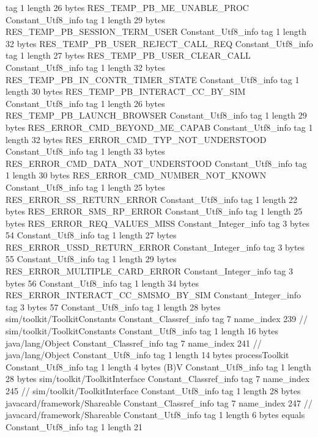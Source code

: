 {{{			tag	1
			length	26
			bytes	RES_TEMP_PB_ME_UNABLE_PROC
		}
		Constant_Utf8_info {
			tag	1
			length	29
			bytes	RES_TEMP_PB_SESSION_TERM_USER
		}
		Constant_Utf8_info {
			tag	1
			length	32
			bytes	RES_TEMP_PB_USER_REJECT_CALL_REQ
		}
		Constant_Utf8_info {
			tag	1
			length	27
			bytes	RES_TEMP_PB_USER_CLEAR_CALL
		}
		Constant_Utf8_info {
			tag	1
			length	32
			bytes	RES_TEMP_PB_IN_CONTR_TIMER_STATE
		}
		Constant_Utf8_info {
			tag	1
			length	30
			bytes	RES_TEMP_PB_INTERACT_CC_BY_SIM
		}
		Constant_Utf8_info {
			tag	1
			length	26
			bytes	RES_TEMP_PB_LAUNCH_BROWSER
		}
		Constant_Utf8_info {
			tag	1
			length	29
			bytes	RES_ERROR_CMD_BEYOND_ME_CAPAB
		}
		Constant_Utf8_info {
			tag	1
			length	32
			bytes	RES_ERROR_CMD_TYP_NOT_UNDERSTOOD
		}
		Constant_Utf8_info {
			tag	1
			length	33
			bytes	RES_ERROR_CMD_DATA_NOT_UNDERSTOOD
		}
		Constant_Utf8_info {
			tag	1
			length	30
			bytes	RES_ERROR_CMD_NUMBER_NOT_KNOWN
		}
		Constant_Utf8_info {
			tag	1
			length	25
			bytes	RES_ERROR_SS_RETURN_ERROR
		}
		Constant_Utf8_info {
			tag	1
			length	22
			bytes	RES_ERROR_SMS_RP_ERROR
		}
		Constant_Utf8_info {
			tag	1
			length	25
			bytes	RES_ERROR_REQ_VALUES_MISS
		}
		Constant_Integer_info {
			tag	3
			bytes	54
		}
		Constant_Utf8_info {
			tag	1
			length	27
			bytes	RES_ERROR_USSD_RETURN_ERROR
		}
		Constant_Integer_info {
			tag	3
			bytes	55
		}
		Constant_Utf8_info {
			tag	1
			length	29
			bytes	RES_ERROR_MULTIPLE_CARD_ERROR
		}
		Constant_Integer_info {
			tag	3
			bytes	56
		}
		Constant_Utf8_info {
			tag	1
			length	34
			bytes	RES_ERROR_INTERACT_CC_SMSMO_BY_SIM
		}
		Constant_Integer_info {
			tag	3
			bytes	57
		}
		Constant_Utf8_info {
			tag	1
			length	28
			bytes	sim/toolkit/ToolkitConstants
		}
		Constant_Classref_info {
			tag	7
			name_index	239		// sim/toolkit/ToolkitConstants
		}
		Constant_Utf8_info {
			tag	1
			length	16
			bytes	java/lang/Object
		}
		Constant_Classref_info {
			tag	7
			name_index	241		// java/lang/Object
		}
		Constant_Utf8_info {
			tag	1
			length	14
			bytes	processToolkit
		}
		Constant_Utf8_info {
			tag	1
			length	4
			bytes	(B)V
		}
		Constant_Utf8_info {
			tag	1
			length	28
			bytes	sim/toolkit/ToolkitInterface
		}
		Constant_Classref_info {
			tag	7
			name_index	245		// sim/toolkit/ToolkitInterface
		}
		Constant_Utf8_info {
			tag	1
			length	28
			bytes	javacard/framework/Shareable
		}
		Constant_Classref_info {
			tag	7
			name_index	247		// javacard/framework/Shareable
		}
		Constant_Utf8_info {
			tag	1
			length	6
			bytes	equals
		}
		Constant_Utf8_info {
			tag	1
			length	21
}}}

